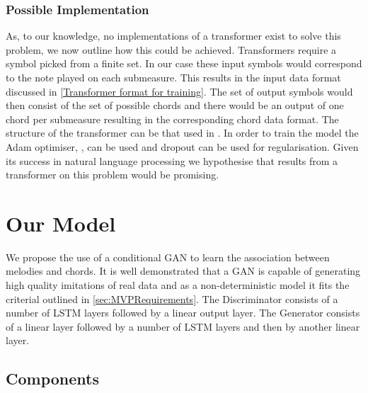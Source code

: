 \subsubsection{Possible Implementation}
As, to our knowledge, no implementations of a transformer exist to solve this problem, we now outline how this could be achieved.
Transformers require a symbol picked from a finite set. 
In our case these input symbols would correspond to the note played on each submeasure.
This results in the input data format discussed in \autoref{Transformer format for training}.
The set of output symbols would then consist of the set of possible chords and there would be an output of one chord per submeasure resulting in the corresponding chord data format.
The structure of the transformer can be that used in \cite{Transformers}.
In order to train the model the Adam optimiser, \cite{Adam}, can be used and dropout can be used for regularisation.
Given its success in natural language processing we hypothesise that results from a transformer on this problem would be promising.

\section{Our Model}
\label{Our Model}
We propose the use of a conditional GAN to learn the association between melodies and chords.
It is well demonstrated that a GAN is capable of generating high quality imitations of real data and as a non-deterministic model it fits the criterial outlined in \autoref{sec:MVPRequirements}.
The Discriminator consists of a number of LSTM layers followed by a linear output layer.
The Generator consists of a linear layer followed by a number of LSTM layers and then by another linear layer.
\subsection{Components}

